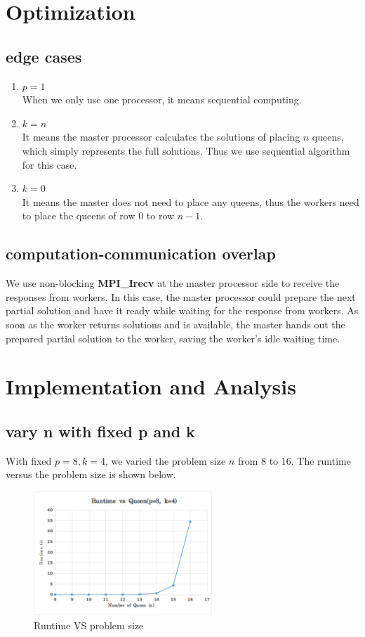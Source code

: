 \documentclass[twoside,12pt]{article}
\begin{document}
\section{Optimization}
\subsection{edge cases}
\begin{enumerate}
	\item $ p = 1 $ \\
	When we only use one processor, it means sequential computing. 
	\item $ k = n $ \\
	It means the master processor calculates the solutions of placing $ n $ queens, which simply represents the full solutions. Thus we use sequential algorithm for this case.	
	\item $ k = 0 $ \\
	It means the master does not need to place any queens, thus the workers need to place the queens of row $ 0 $ to row $ n-1 $.
		
\end{enumerate}

\subsection{computation-communication overlap}
We use non-blocking \textbf{MPI\_Irecv} at the master processor side to receive the responses from workers. In this case, the master processor could prepare the next partial solution and have it ready while waiting for the response from workers. As soon as the worker returns solutions and is available, the master hands out the prepared partial solution to the worker, saving the worker's idle waiting time. 


\section{Implementation and Analysis}
\subsection{vary n with fixed p and k}
	With fixed $ p = 8, k = 4 $, we varied the problem size $ n $ from 8 to 16. The runtime versus the problem size is shown below.
	\begin{figure}[H]
		\centering
		\includegraphics[width=0.6\textwidth]{runVSn}
		\caption{Runtime VS problem size}
	\end{figure}
	
\end{document}
